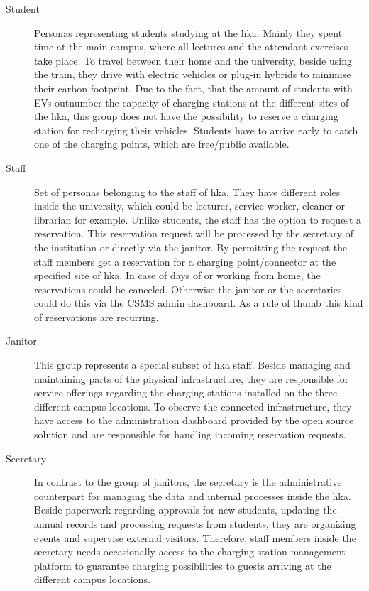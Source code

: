 \begin{description}
    \item[Student] Personas representing students studying at the \acrshort{hka}. Mainly they spent time at the main campus, where all lectures and the attendant exercises take place. To travel between their home and the university, beside using the train, they drive with electric vehicles or plug-in hybrids to minimise their carbon footprint. Due to the fact, that the amount of students with EVs outnumber the capacity of charging stations at the different sites of the \acrshort{hka}, this group does not have the possibility to reserve a charging station for recharging their vehicles. Students have to arrive early to catch one of the charging points, which are free/public available.
    \item[Staff] Set of personas belonging to the staff of \acrshort{hka}. They have different roles inside the university, which could be lecturer, service worker, cleaner or librarian for example. Unlike students, the staff has the option to request a reservation. This reservation request will be processed by the secretary of the institution or directly via the janitor. By permitting the request the staff members get a reservation for a charging point/connector at the specified site of \acrshort{hka}. In case of days of or working from home, the reservations could be canceled. Otherwise the janitor or the secretaries could do this via the CSMS admin dashboard. As a rule of thumb this kind of reservations are recurring.
    \item[Janitor] This group represents a special subset of \acrshort{hka} staff. Beside managing and maintaining parts of the physical infrastructure, they are responsible for service offerings regarding the charging stations installed on the three different campus locations. To observe the connected infrastructure, they have access to the administration dashboard provided by the open source solution and are responsible for handling incoming reservation requests. 
    \item[Secretary] In contrast to the group of janitors, the secretary is the administrative counterpart for managing the data and internal processes inside the \acrshort{hka}. Beside paperwork regarding approvals for new students, updating the annual records and processing requests from students, they are organizing events and supervise external visitors. Therefore, staff members inside the secretary needs occasionally access to the charging station management platform to guarantee charging possibilities to guests arriving at the different campus locations.
\end{description}

